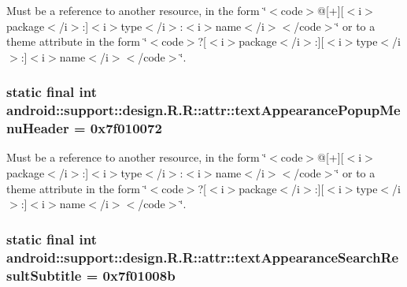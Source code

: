 Must be a reference to another resource, in the form \char`\"{}$<$code$>$@\mbox{[}+\mbox{]}\mbox{[}$<$i$>$package$<$/i$>$:\mbox{]}$<$i$>$type$<$/i$>$:$<$i$>$name$<$/i$>$$<$/code$>$\char`\"{} or to a theme attribute in the form \char`\"{}$<$code$>$?\mbox{[}$<$i$>$package$<$/i$>$:\mbox{]}\mbox{[}$<$i$>$type$<$/i$>$:\mbox{]}$<$i$>$name$<$/i$>$$<$/code$>$\char`\"{}. \hypertarget{classandroid_1_1support_1_1design_1_1_r_1_1attr_1ea7e94af0881cbbf1754651e75f25b7}{
\subsubsection[{textAppearancePopupMenuHeader}]{\setlength{\rightskip}{0pt plus 5cm}static final int android::support::design.R.R::attr::textAppearancePopupMenuHeader = 0x7f010072}}
\label{classandroid_1_1support_1_1design_1_1_r_1_1attr_1ea7e94af0881cbbf1754651e75f25b7}


Must be a reference to another resource, in the form \char`\"{}$<$code$>$@\mbox{[}+\mbox{]}\mbox{[}$<$i$>$package$<$/i$>$:\mbox{]}$<$i$>$type$<$/i$>$:$<$i$>$name$<$/i$>$$<$/code$>$\char`\"{} or to a theme attribute in the form \char`\"{}$<$code$>$?\mbox{[}$<$i$>$package$<$/i$>$:\mbox{]}\mbox{[}$<$i$>$type$<$/i$>$:\mbox{]}$<$i$>$name$<$/i$>$$<$/code$>$\char`\"{}. \hypertarget{classandroid_1_1support_1_1design_1_1_r_1_1attr_c8b9ea22b10cb3403590ababbd5e1eda}{
\subsubsection[{textAppearanceSearchResultSubtitle}]{\setlength{\rightskip}{0pt plus 5cm}static final int android::support::design.R.R::attr::textAppearanceSearchResultSubtitle = 0x7f01008b}}
\label{classandroid_1_1support_1_1design_1_1_r_1_1attr_c8b9ea22b10cb3403590ababbd5e1eda}


